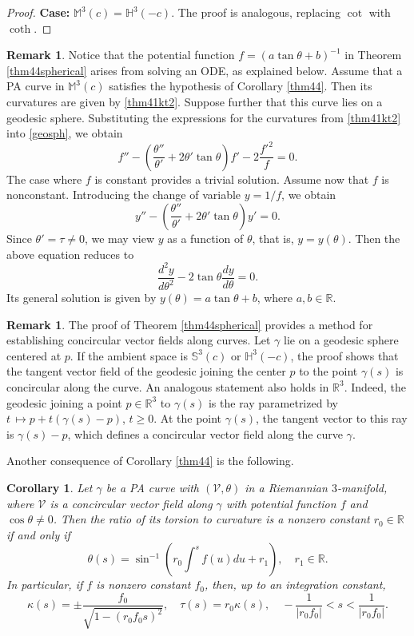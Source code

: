 \documentclass[12pt]{amsart}
\def\r{\mathbb R}
\def\m{\mathbb M}
\def\s{\mathbb S}
\def\h{\mathbb H}
\def\v{\mathcal V}
\newtheorem{corollary}[theorem]{Corollary}
\theoremstyle{definition}
\newtheorem{remark}[theorem]{Remark}
\begin{document}
\begin{proof}
\textbf{Case:} $\m^3(c)=\h^3(-c)$. The proof is analogous, replacing $\cot$ with $\coth$.
\end{proof}

\begin{remark}
Notice that the potential function $f=(a\tan \theta + b)^{-1}$ in Theorem \ref{thm44spherical} arises from solving an ODE, as explained below. Assume that a PA curve in $\m^3(c)$ satisfies the hypothesis of Corollary \ref{thm44}. Then its curvatures are given by \eqref{thm41kt2}. Suppose further that this curve lies on a geodesic sphere. Substituting the expressions for the curvatures from \eqref{thm41kt2} into \eqref{geosph}, we obtain
$$
f''-\left (\frac{\theta''}{\theta'}+2\theta'\tan \theta \right)f'-2\frac{f'^2}{f}=0.
$$
The case where $f$ is constant provides a trivial solution. Assume now that $f$ is nonconstant. Introducing the change of variable $y=1/f$, we obtain
$$
y''-\left (\frac{\theta''}{\theta'}+2\theta'\tan \theta \right)y'=0.
$$
Since $\theta'=\tau\neq 0$, we may view $y$ as a function of $\theta$, that is, $y=y(\theta)$. Then the above equation reduces to
$$
\frac{d^2y}{d\theta^2}-2\tan\theta\frac{dy}{d\theta}=0.
$$
Its general solution is given by $y(\theta)=a\tan\theta+b$, where $a,b\in \r$.
\end{remark}

\begin{remark}
The proof of Theorem \ref{thm44spherical} provides a method for establishing concircular vector fields along curves. Let $\gamma$ lie on a geodesic sphere centered at $p$. If the ambient space is $\s^3(c)$ or $\h^3(-c)$, the proof shows that the tangent vector field of the geodesic joining the center $p$ to the point $\gamma(s)$ is concircular along the curve. An analogous statement also holds in $\r^3$. Indeed, the geodesic joining a point $p\in \r^3$ to $\gamma(s)$ is the ray parametrized by $t\, \mapsto p+t(\gamma(s)-p)$, $t\geq 0$. At the point $\gamma(s)$, the tangent vector to this ray is $\gamma(s)-p$, which defines a concircular vector field along the curve $\gamma$.
\end{remark}

Another consequence of Corollary \ref{thm44} is the following.

\begin{corollary} \label{lanc}
Let $\gamma$ be a PA curve with $(\v,\theta)$ in a Riemannian $3$-manifold, where $\v$ is a concircular vector field along $\gamma$ with potential function $f$ and $\cos \theta \neq 0$. Then the ratio of its torsion to curvature is a nonzero constant $r_0\in \r$ if and only if
$$\theta(s)=\sin^{-1}\left(r_0\int^sf(u)du+r_1\right), \quad r_1\in \r.$$
In particular, if $f$ is nonzero constant $f_0$, then, up to an integration constant, 
\begin{equation}
\kappa(s)=\pm\frac{f_0}{\sqrt{1-(r_0f_0s)^2}}, \quad \tau(s)=r_0 \kappa(s), \quad  -\frac{1}{|r_0f_0|}<s<\frac{1}{|r_0f_0|}. \label{conratio}
\end{equation}
\end{corollary}
\end{document}
